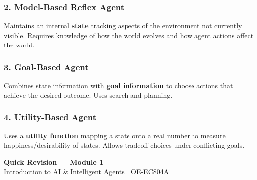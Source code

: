 \documentclass[12pt,a4paper]{article}
\begin{document}
\begin{tcolorbox}[tikzbox, title={Simple Reflex Agent Architecture}]
\centering
{}
\end{tcolorbox}

\subsubsection{2. Model-Based Reflex Agent}
Maintains an internal \textbf{state} tracking aspects of the environment not currently visible. Requires knowledge of how the world evolves and how agent actions affect the world.

\subsubsection{3. Goal-Based Agent}
Combines state information with \textbf{goal information} to choose actions that achieve the desired outcome. Uses search and planning.

\subsubsection{4. Utility-Based Agent}
Uses a \textbf{utility function} mapping a state onto a real number to measure happiness/desirability of states. Allows tradeoff choices under conflicting goals.

\newpage
\begin{center}
  {\large\bfseries\color{myred} Quick Revision --- Module 1}\\[3pt]
  {\small\color{mydark} Introduction to AI \& Intelligent Agents $|$ OE-EC804A}
\end{center}
\noindent{\color{myred}\rule{\linewidth}{1.2pt}}
\vspace{4pt}
\end{document}
